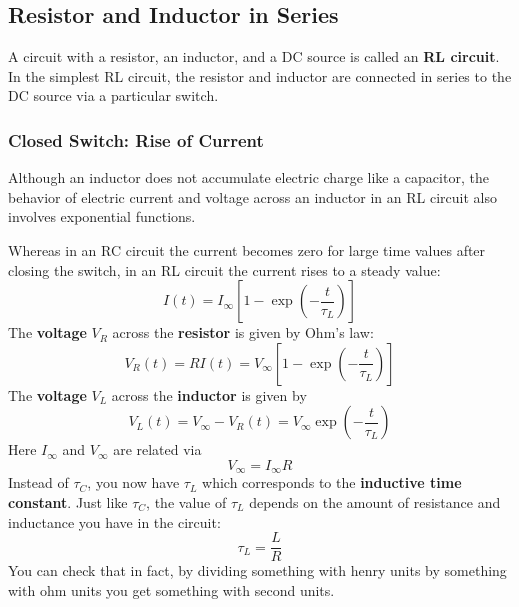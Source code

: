 \subsection{Resistor and Inductor in Series}
A circuit with a resistor, an inductor, and a DC source is called an \textbf{RL circuit}. In the simplest RL circuit, the resistor and inductor are connected in series to the DC source via a particular switch.
\subsubsection{Closed Switch: Rise of Current}
Although an inductor does not accumulate electric charge like a capacitor, the behavior of electric current and voltage across an inductor in an RL circuit also involves exponential functions.

Whereas in an RC circuit the current becomes zero for large time values after closing the switch, in an RL circuit the current rises to a steady value:
\begin{equation}
    I(t) = I_{\infty} \left[ 1 - \exp\left(- \frac{t}{\tau_{L}}\right) \right]
    \label{eq.05.RL.i.rise}
\end{equation}
The \textbf{voltage} $V_{R}$ across the \textbf{resistor} is given by Ohm's law:
\begin{equation}
    V_{R}(t) = R I(t) = V_{\infty} \left[ 1 - \exp\left(- \frac{t}{\tau_{L}}\right) \right]
    \label{eq.05.RL.vR.rise}
\end{equation}
The \textbf{voltage} $V_{L}$ across the \textbf{inductor} is given by
\begin{equation}
    V_{L}(t) = V_{\infty} - V_{R}(t) = V_{\infty} \exp\left(- \frac{t}{\tau_{L}}\right)
    \label{eq.05.RL.vL.rise}
\end{equation}
Here $I_{\infty}$ and $V_{\infty}$ are related via
\begin{equation}
    V_{\infty} = I_{\infty} R
\end{equation}
Instead of $\tau_{C}$, you now have $\tau_{L}$ which corresponds to the \textbf{inductive time constant}. Just like $\tau_{C}$, the value of $\tau_{L}$ depends on the amount of resistance and inductance you have in the circuit:
\begin{equation}
    \tau_{L} = \frac{L}{R}
    \label{eq.05.tauL}
\end{equation}
You can check that in fact, by dividing something with henry units by something with ohm units you get something with second units. 
